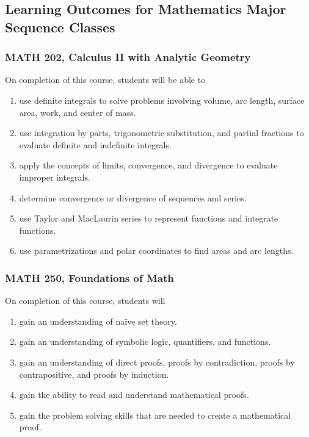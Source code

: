 \documentclass[11pt]{article}
\newenvironment{alphalist}{
\begin{enumerate}[label=(\arabic*),widest=107 ,leftmargin=25pt, itemsep=0pt]}
{\end{enumerate}}
\begin{document}
\subsection{Learning Outcomes for Mathematics Major Sequence Classes}

\subsubsection{MATH 202, Calculus II with Analytic Geometry}

 On completion of this course, students will be able to
 \begin{alphalist}
    \item use definite integrals to solve problems involving volume, arc length, 
       surface area, work, and center of mass. 
    \item use integration by parts, trigonometric substitution, and partial fractions 
        to evaluate definite and indefinite integrals.
    \item apply the concepts of limits, convergence, and divergence to evaluate 
        improper integrals.
    \item determine convergence or divergence of sequences and series.
    \item use Taylor and MacLaurin series to represent functions and integrate 
        functions.
    \item use parametrizations and polar coordinates to find areas and arc lengths.
 \end{alphalist}

\subsubsection{MATH 250, Foundations of Math}

On completion of this course, students will
\begin{alphalist}
    \item gain an understanding of na\"ive set theory. 
    \item gain an understanding of symbolic logic, quantifiers, and functions.
    \item gain an understanding of direct proofs, proofs by contradiction, proofs by contrapositive, and proofs by induction.
    \item gain the ability to read and understand mathematical proofs.
    \item gain the problem solving skills that are needed to create a mathematical proof.
\end{alphalist}
\end{document}
